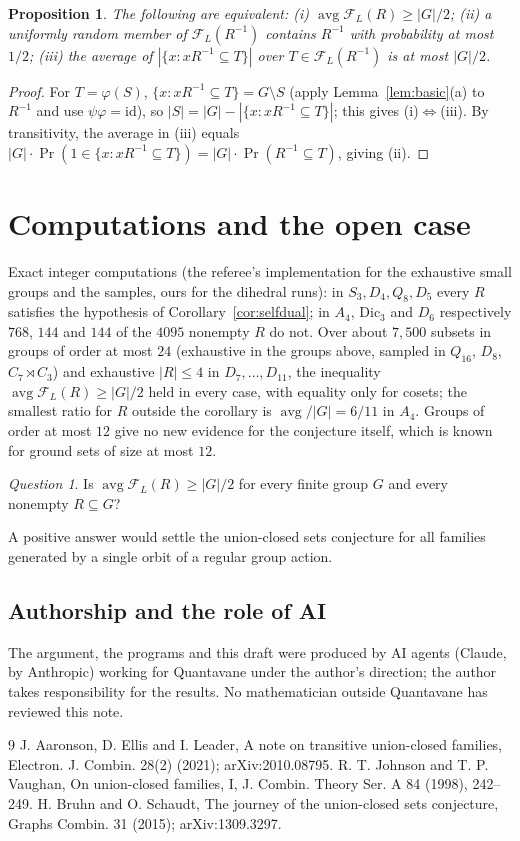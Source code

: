 \documentclass[11pt]{amsart}
\newtheorem{proposition}[theorem]{Proposition}
\theoremstyle{remark}
\newtheorem*{question}{Question}
\newcommand{\avg}{\operatorname{avg}}
\begin{document}
\begin{proposition}\label{prop:equiv}
The following are equivalent: (i) $\avg\mathcal F_L(R)\ge|G|/2$; (ii) a uniformly random member of $\mathcal F_L(R^{-1})$ contains
$R^{-1}$ with probability at most $1/2$; (iii) the average of $|\{x: xR^{-1}\subseteq T\}|$ over $T\in\mathcal F_L(R^{-1})$ is at
most $|G|/2$.
\end{proposition}
\begin{proof}
For $T=\varphi(S)$, $\{x:xR^{-1}\subseteq T\}=G\setminus S$ (apply Lemma~\ref{lem:basic}(a) to $R^{-1}$ and use $\psi\varphi=\mathrm
{id}$), so $|S|=|G|-|\{x:xR^{-1}\subseteq T\}|$; this gives (i)$\Leftrightarrow$(iii). By transitivity, the average in (iii) equals
$|G|\cdot\Pr(1\in\{x:xR^{-1}\subseteq T\})=|G|\cdot\Pr(R^{-1}\subseteq T)$, giving (ii).
\end{proof}

\section{Computations and the open case}
Exact integer computations (the referee's implementation for the exhaustive small groups and the samples, ours for the dihedral runs): in $S_3,D_4,Q_8,D_5$ every $R$ satisfies the hypothesis of
Corollary~\ref{cor:selfdual}; in $A_4$, $\mathrm{Dic}_3$ and $D_6$ respectively $768$, $144$ and $144$ of the $4095$ nonempty $R$ do
not. Over about $7{,}500$ subsets in groups of order at most $24$ (exhaustive in the groups above, sampled in $Q_{16}$, $D_8$,
$C_7\rtimes C_3$) and exhaustive $|R|\le4$ in $D_7,\dots,D_{11}$, the inequality $\avg\mathcal F_L(R)\ge|G|/2$ held in every case,
with equality only for cosets; the smallest ratio for $R$ outside the corollary is $\avg/|G|=6/11$ in $A_4$. Groups of order at most
$12$ give no new evidence for the conjecture itself, which is known for ground sets of size at most $12$.
\begin{question}
Is $\avg\mathcal F_L(R)\ge|G|/2$ for every finite group $G$ and every nonempty $R\subseteq G$?
\end{question}
A positive answer would settle the union-closed sets conjecture for all families generated by a single orbit of a regular group
action.

\subsection*{Authorship and the role of AI}
The argument, the programs and this draft were produced by AI agents (Claude, by Anthropic) working for Quantavane under
the author's direction; the author takes responsibility for the results. No mathematician outside Quantavane has reviewed this note.

\begin{thebibliography}{9}
 J. Aaronson, D. Ellis and I. Leader, A note on transitive union-closed families, Electron. J. Combin. 28(2) (2021);
arXiv:2010.08795.
 R. T. Johnson and T. P. Vaughan, On union-closed families, I, J. Combin. Theory Ser. A 84 (1998), 242--249.
 H. Bruhn and O. Schaudt, The journey of the union-closed sets conjecture, Graphs Combin. 31 (2015); arXiv:1309.3297.
\end{thebibliography}
\end{document}
